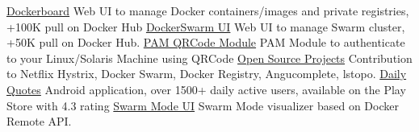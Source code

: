 \begin{cvskills}
  \cvskill
    {\href{https://github.com/mlabouardy/dockerboard}{Dockerboard}}
    {
      Web UI to manage Docker containers/images and private registries, +100K pull on Docker Hub
    }
  \cvskill
    {\href{https://github.com/mlabouardy/dockerswarm-ui}{DockerSwarm UI}}
    {
      Web UI to manage Swarm cluster, +50K pull on Docker Hub.
    }
    \cvskill
    {\href{https://github.com/mlabouardy/pam-qrcode}{PAM QRCode Module}}
    {
      PAM Module to authenticate to your Linux/Solaris Machine using QRCode
    }
    \cvskill
    {\href{https://github.com/mlabouardy}{Open Source Projects}}
    {
      Contribution to Netflix Hystrix, Docker Swarm, Docker Registry, Angucomplete, lstopo.
    }
    \cvskill
    {\href{https://github.com/mlabouardy/daily-quotes}{Daily Quotes}}
    {
      Android application, over 1500+ daily active users, available on the Play Store with 4.3 rating
    }
    \cvskill
    {\href{https://github.com/mlabouardy/swarm-mode-ui}{Swarm Mode UI}}
    {
      Swarm Mode visualizer based on Docker Remote API.
    }
\end{cvskills}